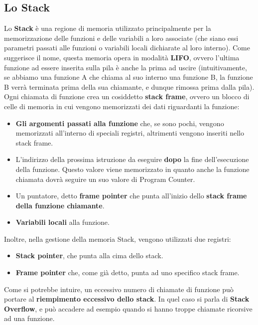 \documentclass[12pt]{report}
\begin{document}
	\subsection{Lo Stack}
	Lo \textbf{Stack} è una regione di memoria utilizzato principalmente per la memorizzazione delle funzioni e delle variabili a loro associate (che siano essi parametri passati alle funzioni o variabili locali dichiarate al loro interno).
	Come suggerisce il nome, questa memoria opera in modalità \textbf{LIFO}, ovvero l'ultima funzione ad essere inserita sulla pila è anche la prima ad uscire (intuitivamente, se abbiamo una funzione A che chiama al suo interno una funzione B, la funzione B verrà terminata prima della sua chiamante, e dunque rimossa prima dalla pila).
	\smallbreak
	Ogni chiamata di funzione crea un cosiddetto \textbf{stack frame}, ovvero un blocco di celle di memoria in cui vengono memorizzati dei dati riguardanti la funzione:
	\begin{itemize}
		\item \textbf{Gli argomenti passati alla funzione} che, se sono pochi, vengono memorizzati all'interno di speciali registri, altrimenti vengono inseriti nello stack frame.
		
		\item L'indirizzo della prossima istruzione da eseguire \textbf{dopo} la fine dell'esecuzione della funzione. Questo valore viene memorizzato in quanto anche la funzione chiamata dovrà seguire un suo valore di Program Counter.
		
		\item Un puntatore, detto \textbf{frame pointer} che punta all'inizio dello \textbf{stack frame della funzione chiamante}.
		
		\item \textbf{Variabili locali} alla funzione.
	\end{itemize}
	
	Inoltre, nella gestione della memoria Stack, vengono utilizzati due registri:
	\begin{itemize}
		\item \textbf{Stack pointer}, che punta alla cima dello stack.
		
		\item \textbf{Frame pointer} che, come già detto, punta ad uno specifico stack frame.
	\end{itemize}
	
	Come si potrebbe intuire, un eccessivo numero di chiamate di funzione può portare al \textbf{riempimento eccessivo dello stack}. In quel caso si parla di \textbf{Stack Overflow}, e può accadere ad esempio quando si hanno troppe chiamate ricorsive ad una funzione.
	
\end{document}
